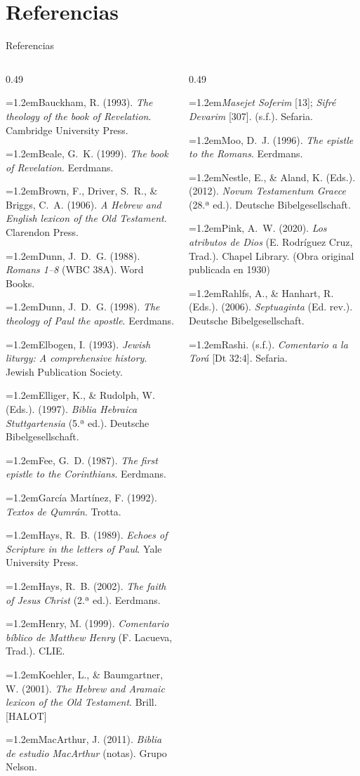\documentclass[hyperref={bookmarks=false},aspectratio=169]{beamer}
\newcommand{\refapa}[1]{\par{\RaggedRight\hangindent=1.2em\hangafter=1\noindent #1\par}\vspace{3pt}}
\begin{document}
\section{Referencias}

\begin{frame}{Referencias}
\fontsize{5.0}{6.0}\selectfont
\begin{columns}[t,onlytextwidth]
\begin{column}{0.49\textwidth}
\refapa{Bauckham, R. (1993). \emph{The theology of the book of Revelation}. Cambridge University Press.}
\refapa{Beale, G.~K. (1999). \emph{The book of Revelation}. Eerdmans.}
\refapa{Brown, F., Driver, S.~R., \& Briggs, C.~A. (1906). \emph{A Hebrew and English lexicon of the Old Testament}. Clarendon Press.}
\refapa{Dunn, J.~D.~G. (1988). \emph{Romans 1--8} (WBC 38A). Word Books.}
\refapa{Dunn, J.~D.~G. (1998). \emph{The theology of Paul the apostle}. Eerdmans.}
\refapa{Elbogen, I. (1993). \emph{Jewish liturgy: A comprehensive history}. Jewish Publication Society.}
\refapa{Elliger, K., \& Rudolph, W. (Eds.). (1997). \emph{Biblia Hebraica Stuttgartensia} (5.ª ed.). Deutsche Bibelgesellschaft.}
\refapa{Fee, G.~D. (1987). \emph{The first epistle to the Corinthians}. Eerdmans.}
\refapa{García Martínez, F. (1992). \emph{Textos de Qumrán}. Trotta.}
\refapa{Hays, R.~B. (1989). \emph{Echoes of Scripture in the letters of Paul}. Yale University Press.}
\refapa{Hays, R.~B. (2002). \emph{The faith of Jesus Christ} (2.ª ed.). Eerdmans.}
\refapa{Henry, M. (1999). \emph{Comentario bíblico de Matthew Henry} (F. Lacueva, Trad.). CLIE.}
\refapa{Koehler, L., \& Baumgartner, W. (2001). \emph{The Hebrew and Aramaic lexicon of the Old Testament}. Brill. [HALOT]}
\refapa{MacArthur, J. (2011). \emph{Biblia de estudio MacArthur} (notas). Grupo Nelson.}
\end{column}
\begin{column}{0.49\textwidth}
\refapa{\emph{Masejet Soferim} [13]; \emph{Sifré Devarim} [307]. (s.f.). Sefaria.}
\refapa{Moo, D.~J. (1996). \emph{The epistle to the Romans}. Eerdmans.}
\refapa{Nestle, E., \& Aland, K. (Eds.). (2012). \emph{Novum Testamentum Graece} (28.ª ed.). Deutsche Bibelgesellschaft.}
\refapa{Pink, A.~W. (2020). \emph{Los atributos de Dios} (E. Rodríguez Cruz, Trad.). Chapel Library. (Obra original publicada en 1930)}
\refapa{Rahlfs, A., \& Hanhart, R. (Eds.). (2006). \emph{Septuaginta} (Ed. rev.). Deutsche Bibelgesellschaft.}
\refapa{Rashi. (s.f.). \emph{Comentario a la Torá} [Dt 32:4]. Sefaria.}

\end{column}
\end{columns}
\end{frame}
\end{document}
